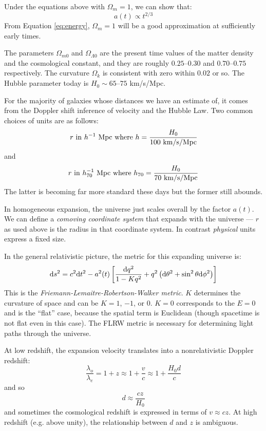 Under the equations above with $\Omega_m = 1$, we can show that:
\begin{equation}
a(t) \propto t^{2/3}
\end{equation}
From Equation \ref{eq:energy}, $\Omega_m = 1$ will be a good
approximation at sufficiently early times.
  
The parameters $\Omega_{m0}$ and $\Omega_{\Lambda 0}$ are the present
time values of the matter density and the cosmological constant, and
they are roughly $0.25$--$0.30$ and $0.70$--$0.75$ respectively.  The
curvature $\Omega_k$ is consistent with zero within $0.02$ or so.
The Hubble parameter today is $H_0 \sim 65$--$75$ km/s/Mpc. 

For the majority of galaxies whose distances we have an estimate of,
it comes from the Doppler shift inference of velocity and the Hubble
Law. Two common choices of units are as follows:
\begin{equation}
r {\rm ~in~}h^{-1}{\rm ~Mpc} {\rm ~where~} h = \frac{H_0}{100 {\rm
    ~km/s/Mpc}} 
\end{equation}
and 
\begin{equation}
r {\rm ~in~}h_{70}^{-1}{\rm ~Mpc} {\rm ~where~} h_{70} = \frac{H_0}{70
  {\rm ~km/s/Mpc}}
\end{equation}
The latter is becoming far more standard these days but the former
still abounds.

In homogeneous expansion, the universe just scales overall by the
factor $a(t)$. We can define a {\it comoving coordinate system} that
expands with the universe --- $r$ as used above is the radius in that
coordinate system. In contrast {\it physical} units express a fixed
size.

In the general relativistic picture, the metric for this expanding
universe is:
\begin{equation}
{\rm d}s^2 = c^2 {\rm d}t^2 - a^2(t) \left[ \frac{{\rm d}q^2}{1-Kq^2}
  + q^2\left({\rm d}\theta^2+ \sin^2\theta{\rm d}\phi^2\right) \right] 
\end{equation}
This is the {\it Friemann-Lemaitre-Robertson-Walker metric}.  $K$
determines the curvature of space and can be $K=1$, $-1$, or $0$.
$K=0$ corresponds to the $E=0$ and is the ``flat'' case, because the
spatial term is Euclidean (though spacetime is not flat even in this
case).  The FLRW metric is necessary for determining light paths
through the universe.

At low redshift, the expansion velocity translates into a
nonrelativistic Doppler redshift:
\begin{equation} 
\frac{\lambda_o}{\lambda_e} = 1+z  \approx 1 + \frac{v}{c} \approx 1
+ \frac{H_0 d}{c}
\end{equation} 
and so
\begin{equation}
d \approx \frac{cz}{H_0}
\end{equation}
and sometimes the cosmological redshift is expressed in terms of
$v\approx cz$. At high redshift (e.g. above unity), the relationship
between $d$ and $z$ is ambiguous. 

